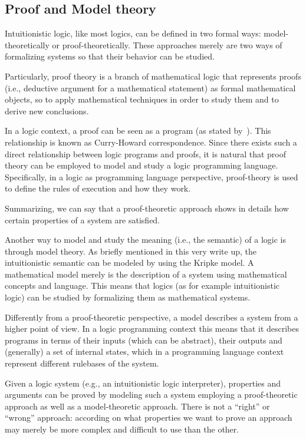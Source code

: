 \begin{appendices}
  \section{Proof and Model theory}
  Intuitionistic logic, like most logics, can be defined in two formal ways:
  model-theoretically or proof-theoretically.
  These approaches merely are two ways of formalizing systems so that
  their behavior can be studied.

  Particularly, proof theory is a branch of mathematical logic that represents proofs (i.e.,
  deductive argument for a mathematical statement) as formal
  mathematical objects, so to apply mathematical techniques in
  order to study them and to derive new conclusions.

  In a logic context, a proof can be seen as a program (as stated by~\cite{PropAsTypes}).
  This relationship is known as Curry-Howard correspondence. Since there exists
  such a direct relationship between logic programs and proofs, it is
  natural that proof theory can be employed to model and study a logic programming
  language. Specifically, in a logic as programming language perspective,
  proof-theory is used to define the rules of execution and how they work.

  Summarizing, we can say that a proof-theoretic approach shows in details how certain
  properties of a system are satisfied.

  Another way to model and study the meaning (i.e., the semantic) of a logic is through model
  theory. As briefly mentioned in this very write up, the intuitionistic semantic can be
  modeled by using the Kripke model. A mathematical model merely is the description of
  a system using mathematical concepts and language. This means that logics
  (as for example intuitionistic logic) can be studied by formalizing them as
  mathematical systems.

  Differently from a proof-theoretic perspective, a model describes a system from a
  higher point of view. In a logic programming context this means that it describes
  programs in terms of their inputs (which can be abstract), their outputs
  and (generally) a set of internal states, which in a programming language context
  represent different rulebases of the system.

  Given a logic system (e.g., an intuitionistic logic interpreter), properties and
  arguments can be proved by modeling such a system employing a proof-theoretic approach
  as well as a model-theoretic approach.
  There is not a ``right'' or ``wrong'' approach: according on what properties we want to prove
  an approach may merely be more complex and difficult to use than the other.
\end{appendices}
